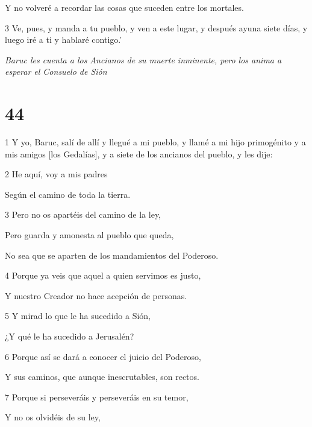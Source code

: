 \par Y no volveré a recordar las cosas que suceden entre los mortales.

\par 3 Ve, pues, y manda a tu pueblo, y ven a este lugar, y después ayuna siete días, y luego iré a ti y hablaré contigo.'

\par \textit{Baruc les cuenta a los Ancianos de su muerte inminente, pero los anima a esperar el Consuelo de Sión}

\chapter{44}

\par 1 Y yo, Baruc, salí de allí y llegué a mi pueblo, y llamé a mi hijo primogénito y a mis amigos [los Gedalías], y a siete de los ancianos del pueblo, y les dije:

\par 2 He aquí, voy a mis padres

\par Según el camino de toda la tierra.

\par 3 Pero no os apartéis del camino de la ley,

\par Pero guarda y amonesta al pueblo que queda,

\par No sea que se aparten de los mandamientos del Poderoso.

\par 4 Porque ya veis que aquel a quien servimos es justo,

\par Y nuestro Creador no hace acepción de personas.

\par 5 Y mirad lo que le ha sucedido a Sión,

\par ¿Y qué le ha sucedido a Jerusalén?

\par 6 Porque así se dará a conocer el juicio del Poderoso,

\par Y sus caminos, que aunque inescrutables, son rectos.

\par 7 Porque si perseveráis y perseveráis en su temor,

\par Y no os olvidéis de su ley,

